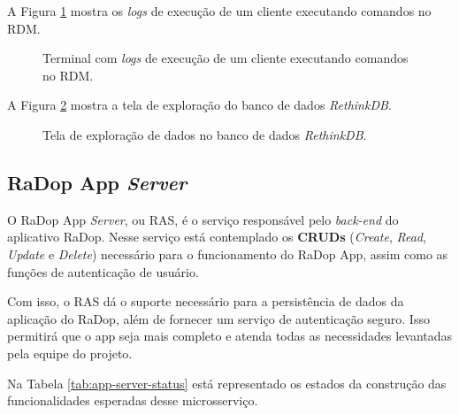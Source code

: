 A Figura \ref{fig:rdm-cliente} mostra os \textit{logs} de execução de um cliente executando comandos no RDM. 

\begin{figure}[H]
	\caption{\label{fig:rdm-cliente} Terminal com \textit{logs} de execução de um cliente executando comandos no RDM.}
\end{figure}

A Figura  \ref{fig:explorer-rethinkdb} mostra a tela de exploração do banco de dados \textit{RethinkDB}.

\begin{figure}[H]
	\caption{\label{fig:explorer-rethinkdb} Tela de exploração de dados no banco de dados \textit{RethinkDB}.}
\end{figure}

\subsection{RaDop App \textit{Server}}

O RaDop App \textit{Server}, ou RAS, é o serviço responsável pelo \textit{back-end} do aplicativo RaDop. Nesse serviço está contemplado os \textbf{CRUDs} (\textit{Create}, \textit{Read}, \textit{Update} e \textit{Delete}) necessário para o funcionamento do RaDop App, assim como as funções de autenticação de usuário.

Com isso, o RAS dá o suporte necessário para a persistência de dados da aplicação do RaDop, além de fornecer um serviço de autenticação seguro. Isso permitirá que o app seja mais completo e atenda todas as necessidades levantadas pela equipe do projeto.

Na Tabela \ref{tab:app-server-status} está representado os estados da construção das funcionalidades esperadas desse microsserviço. 

